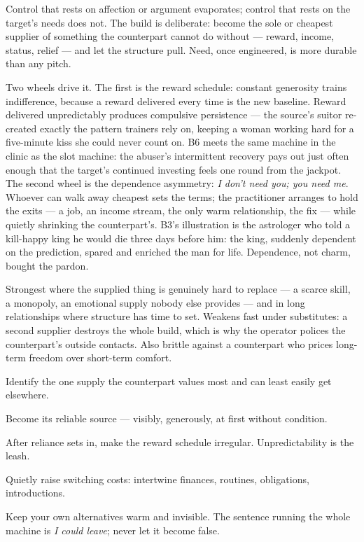 \begin{core}
Control that rests on affection or argument evaporates; control that rests on the target's needs does not. The build is deliberate: become the sole or cheapest supplier of something the counterpart cannot do without --- reward, income, status, relief --- and let the structure pull. Need, once engineered, is more durable than any pitch.
\end{core}
\begin{mechanism}
Two wheels drive it. The first is the reward schedule: constant generosity trains indifference, because a reward delivered every time is the new baseline. Reward delivered unpredictably produces compulsive persistence --- the source's suitor re-created exactly the pattern trainers rely on, keeping a woman working hard for a five-minute kiss she could never count on. B6 meets the same machine in the clinic as the slot machine: the abuser's intermittent recovery pays out just often enough that the target's continued investing feels one round from the jackpot. The second wheel is the dependence asymmetry: \emph{I don't need you; you need me}. Whoever can walk away cheapest sets the terms; the practitioner arranges to hold the exits --- a job, an income stream, the only warm relationship, the fix --- while quietly shrinking the counterpart's. B3's illustration is the astrologer who told a kill-happy king he would die three days before him: the king, suddenly dependent on the prediction, spared and enriched the man for life. Dependence, not charm, bought the pardon.
\end{mechanism}
\begin{conditions}
Strongest where the supplied thing is genuinely hard to replace --- a scarce skill, a monopoly, an emotional supply nobody else provides --- and in long relationships where structure has time to set. Weakens fast under substitutes: a second supplier destroys the whole build, which is why the operator polices the counterpart's outside contacts. Also brittle against a counterpart who prices long-term freedom over short-term comfort.
\end{conditions}
\begin{application}
  \item Identify the one supply the counterpart values most and can least easily get elsewhere.
  \item Become its reliable source --- visibly, generously, at first without condition.
  \item After reliance sets in, make the reward schedule irregular. Unpredictability is the leash.
  \item Quietly raise switching costs: intertwine finances, routines, obligations, introductions.
  \item Keep your own alternatives warm and invisible. The sentence running the whole machine is \emph{I could leave}; never let it become false.
\end{application}
